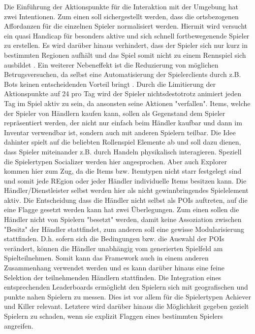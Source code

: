 Die Einführung der Aktionspunkte für die Interaktion mit der Umgebung hat zwei Intentionen. Zum einen soll sichergestellt werden, dass die ortsbezogenen Affordanzen für die einzelnen Spieler normalisiert werden. Hiermit wird versucht ein quasi Handicap für besonders aktive und sich schnell fortbewegenende Spieler zu erstellen. Es wird darüber hinaus verhindert, dass der Spieler sich nur kurz in bestimmten Regionen aufhält und das Spiel somit nicht zu einem Rennspiel sich ausbildet \cite{Schlieder.2005}. Ein weiterer Nebeneffekt ist die Reduzierung von möglichen Betrugsversuchen, da selbst eine Automatisierung der Spielerclients durch z.B. Bots keinen entscheidenden Vorteil bringt \cite{Golle.2005}. Durch die Limitierung der Aktionspunkte auf 24 pro Tag wird der Spieler nichtsdestotrotz animiert jeden Tag im Spiel aktiv zu sein, da ansonsten seine Aktionen "verfallen". Items, welche der Spieler von Händlern kaufen kann, sollen als Gegenstand dem Spieler repräsentiert werden, der nicht nur einfach beim Händler kaufbar und dann im Inventar verwendbar ist, sondern auch mit anderen Spielern teilbar. Die Idee dahinter spielt auf die beliebten Rollenspiel Elemente ab und soll dazu dienen, dass Spieler miteinander z.B. durch Handeln physikalisch interagieren. Speziell die Spielertypen Socializer werden hier angesprochen. Aber auch Explorer kommen hier zum Zug, da die Items bzw. Itemtypen nicht starr festgelegt sind und somit jede REgion oder jeder Händler individuelle Items besitzen kann. Die Händler/Dienstleister selbst werden hier als nicht gewinnbringendes Spielelement aktiv. Die Entscheidung dass die Händler nicht selbst als POIs auftreten, auf die eine Flagge gesetzt werden kann hat zwei Überlegungen. Zum einen sollen die Händler nicht von Spielern "besetzt" werden, damit keine Assoziation zwischen "Besitz" der Händler stattfindet, zum anderen soll eine gewisse Modularisierung stattfinden. D.h. sofern sich die Bedingungen bzw. die Auswahl der POIs verändert, können die Händler unabhängig vom generierten Spielfeld am Spielteilnehmen. Somit kann das Framework auch in einem anderen Zusammenhang verwendet werden und es kann darüber hinaus eine feine Selektion der teilnehmenden Händlern stattfinden.
Die Integration eines entsprechenden Leaderboards ermöglicht den Spielern sich mit geografischen und punkte nahen Spielern zu messen. Dies ist vor allem für die Spielertypen Achiever und Killer relevant. Letztere wird darüber hinaus die Möglichkeit gegeben gezielt Spielern zu schaden, wenn sie explizit Flaggen eines bestimmten Spielers angreifen.
\\\\
